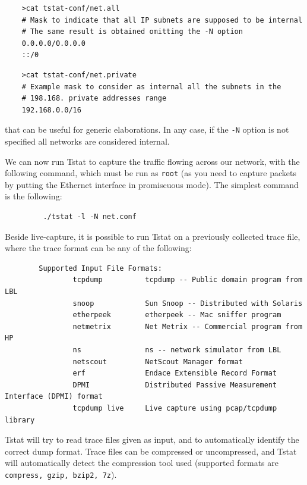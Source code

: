 \documentclass[11pt]{article}
\begin{document}
\begin{small}\begin{verbatim}
    >cat tstat-conf/net.all
    # Mask to indicate that all IP subnets are supposed to be internal
    # The same result is obtained omitting the -N option
    0.0.0.0/0.0.0.0
    ::/0
\end{verbatim}\end{small} \noindent
\begin{small}\begin{verbatim}
    >cat tstat-conf/net.private
    # Example mask to consider as internal all the subnets in the 
    # 198.168. private addresses range
    192.168.0.0/16
\end{verbatim}\end{small} \noindent
that can be useful for generic elaborations. In any case, if the \texttt{-N} option
is not specified all networks are considered internal.



We can now run Tstat to capture the traffic flowing across 
our network, with the following command, which must be run as \texttt{root} (as you
need to capture packets by putting the Ethernet interface in promiscuous mode).
The simplest command is the following:

\begin{small}\begin{verbatim}
         ./tstat -l -N net.conf
\end{verbatim}\end{small} \noindent
Beside live-capture, it is possible to run Tstat on a previously collected 
trace file, where the trace format can be any of the following:

\begin{small}\begin{verbatim}
        Supported Input File Formats:
                tcpdump          tcpdump -- Public domain program from LBL
                snoop            Sun Snoop -- Distributed with Solaris
                etherpeek        etherpeek -- Mac sniffer program
                netmetrix        Net Metrix -- Commercial program from HP
                ns               ns -- network simulator from LBL
                netscout         NetScout Manager format
                erf              Endace Extensible Record Format
                DPMI             Distributed Passive Measurement Interface (DPMI) format
                tcpdump live     Live capture using pcap/tcpdump library
\end{verbatim}\end{small} \noindent
Tstat will try to read trace files given as input, and to automatically identify
the correct dump format. Trace files can be compressed or uncompressed, and
Tstat will automatically detect the compression tool used (supported formats are
\texttt{compress, gzip, bzip2, 7z}).
\end{document}
